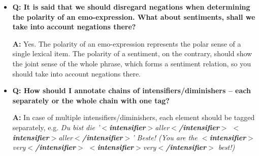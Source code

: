 \documentclass[11pt,a4paper]{article}
\newcommand{\xmltag}[1]{{\textbf{\small$<$#1$>$}}}
\newcommand{\intensifier}[1]{\xmltag{intensifier}#1\xmltag{/intensifier}}
\begin{document}
\begin{itemize}
\item\textbf{Q: It is said that we should disregard negations when
  determining the polarity of an emo-expression.  What about
  sentiments, shall we take into account negations there?}

  \textbf{A:} Yes.  The polarity of an emo-expression represents the
  polar sense of a single lexical item.  The polarity of a sentiment,
  on the contrary, should show the joint sense of the whole phrase,
  which forms a sentiment relation, so you should take into account
  negations there.

\item\textbf{Q: How should I annotate chains of
  intensifiers/diminishers -- each separately or the whole chain with
  one tag?}

  \textbf{A:} In case of multiple intensifiers/diminishers, each
  element should be tagged separately, e.g. \textit{Du bist die
    '\intensifier{aller} \intensifier{aller}' Beste! (You are the
    \intensifier{very} \intensifier{very} best!)}


\end{itemize}
\end{document}
